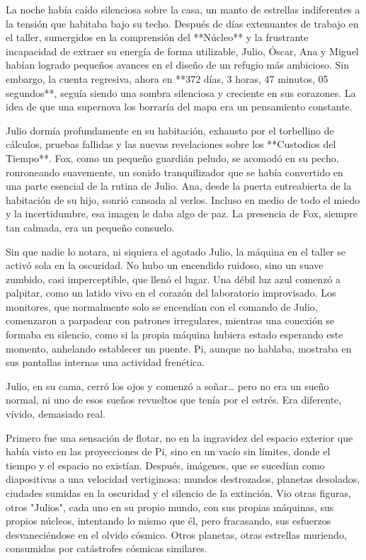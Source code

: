 \documentclass[a4paper,12pt]{book}
\begin{document}
La noche había caído silenciosa sobre la casa, un manto de estrellas indiferentes a la tensión que habitaba bajo su techo. Después de días extenuantes de trabajo en el taller, sumergidos en la comprensión del **Núcleo** y la frustrante incapacidad de extraer su energía de forma utilizable, Julio, Óscar, Ana y Miguel habían logrado pequeños avances en el diseño de un refugio más ambicioso. Sin embargo, la cuenta regresiva, ahora en **372 días, 3 horas, 47 minutos, 05 segundos**, seguía siendo una sombra silenciosa y creciente en sus corazones. La idea de que una supernova los borraría del mapa era un pensamiento constante.

Julio dormía profundamente en su habitación, exhausto por el torbellino de cálculos, pruebas fallidas y las nuevas revelaciones sobre los **Custodios del Tiempo**. Fox, como un pequeño guardián peludo, se acomodó en su pecho, ronroneando suavemente, un sonido tranquilizador que se había convertido en una parte esencial de la rutina de Julio. Ana, desde la puerta entreabierta de la habitación de su hijo, sonrió cansada al verlos. Incluso en medio de todo el miedo y la incertidumbre, esa imagen le daba algo de paz. La presencia de Fox, siempre tan calmada, era un pequeño consuelo.

Sin que nadie lo notara, ni siquiera el agotado Julio, la máquina en el taller se activó sola en la oscuridad. No hubo un encendido ruidoso, sino un suave zumbido, casi imperceptible, que llenó el lugar. Una débil luz azul comenzó a palpitar, como un latido vivo en el corazón del laboratorio improvisado. Los monitores, que normalmente solo se encendían con el comando de Julio, comenzaron a parpadear con patrones irregulares, mientras una conexión se formaba en silencio, como si la propia máquina hubiera estado esperando este momento, anhelando establecer un puente. Pi, aunque no hablaba, mostraba en sus pantallas internas una actividad frenética.

Julio, en su cama, cerró los ojos y comenzó a soñar… pero no era un sueño normal, ni uno de esos sueños revueltos que tenía por el estrés. Era diferente, vívido, demasiado real.

Primero fue una sensación de flotar, no en la ingravidez del espacio exterior que había visto en las proyecciones de Pi, sino en un vacío sin límites, donde el tiempo y el espacio no existían. Después, imágenes, que se sucedían como diapositivas a una velocidad vertiginosa: mundos destrozados, planetas desolados, ciudades sumidas en la oscuridad y el silencio de la extinción. Vio otras figuras, otros "Julios", cada uno en su propio mundo, con sus propias máquinas, sus propios núcleos, intentando lo mismo que él, pero fracasando, sus esfuerzos desvaneciéndose en el olvido cósmico. Otros planetas, otras estrellas muriendo, consumidas por catástrofes cósmicas similares.
\end{document}
